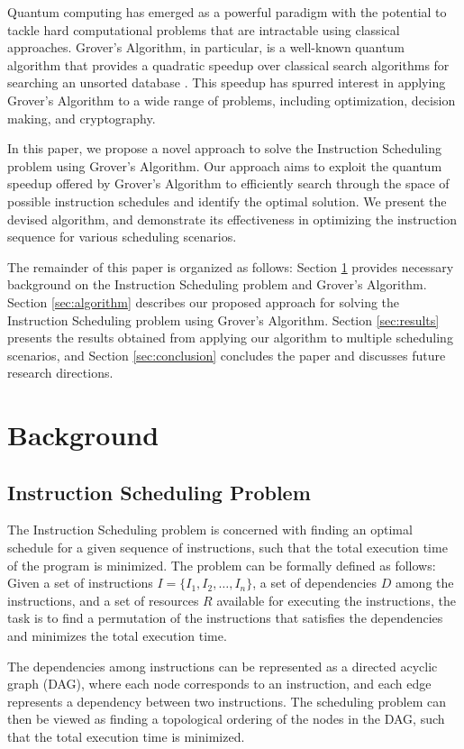 Quantum computing has emerged as a powerful paradigm with the potential to tackle hard computational problems that are intractable using classical approaches. Grover's Algorithm, in particular, is a well-known quantum algorithm that provides a quadratic speedup over classical search algorithms for searching an unsorted database \cite{grover1996fast}. This speedup has spurred interest in applying Grover's Algorithm to a wide range of problems, including optimization, decision making, and cryptography.

In this paper, we propose a novel approach to solve the Instruction Scheduling problem using Grover's Algorithm. Our approach aims to exploit the quantum speedup offered by Grover's Algorithm to efficiently search through the space of possible instruction schedules and identify the optimal solution. We present the devised algorithm, and demonstrate its effectiveness in optimizing the instruction sequence for various scheduling scenarios.

The remainder of this paper is organized as follows: Section \ref{sec:background} provides necessary background on the Instruction Scheduling problem and Grover's Algorithm. Section \ref{sec:algorithm} describes our proposed approach for solving the Instruction Scheduling problem using Grover's Algorithm. Section \ref{sec:results} presents the results obtained from applying our algorithm to multiple scheduling scenarios, and Section \ref{sec:conclusion} concludes the paper and discusses future research directions.

\section{Background}\label{sec:background}
\subsection{Instruction Scheduling Problem}
The Instruction Scheduling problem is concerned with finding an optimal schedule for a given sequence of instructions, such that the total execution time of the program is minimized. The problem can be formally defined as follows: Given a set of instructions $I = \{I_1, I_2, \dots, I_n\}$, a set of dependencies $D$ among the instructions, and a set of resources $R$ available for executing the instructions, the task is to find a permutation of the instructions that satisfies the dependencies and minimizes the total execution time.

The dependencies among instructions can be represented as a directed acyclic graph (DAG), where each node corresponds to an instruction, and each edge represents a dependency between two instructions. The scheduling problem can then be viewed as finding a topological ordering of the nodes in the DAG, such that the total execution time is minimized.

